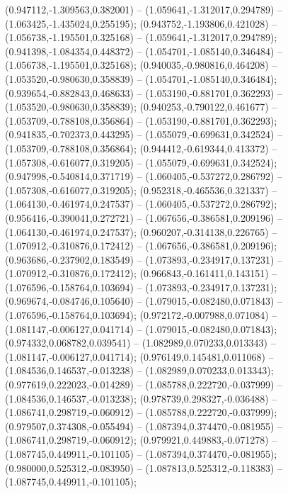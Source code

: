  (0.947112,-1.309563,0.382001) -- (1.059641,-1.312017,0.294789) -- (1.063425,-1.435024,0.255195);
 (0.943752,-1.193806,0.421028) -- (1.056738,-1.195501,0.325168) -- (1.059641,-1.312017,0.294789);
 (0.941398,-1.084354,0.448372) -- (1.054701,-1.085140,0.346484) -- (1.056738,-1.195501,0.325168);
 (0.940035,-0.980816,0.464208) -- (1.053520,-0.980630,0.358839) -- (1.054701,-1.085140,0.346484);
 (0.939654,-0.882843,0.468633) -- (1.053190,-0.881701,0.362293) -- (1.053520,-0.980630,0.358839);
 (0.940253,-0.790122,0.461677) -- (1.053709,-0.788108,0.356864) -- (1.053190,-0.881701,0.362293);
 (0.941835,-0.702373,0.443295) -- (1.055079,-0.699631,0.342524) -- (1.053709,-0.788108,0.356864);
 (0.944412,-0.619344,0.413372) -- (1.057308,-0.616077,0.319205) -- (1.055079,-0.699631,0.342524);
 (0.947998,-0.540814,0.371719) -- (1.060405,-0.537272,0.286792) -- (1.057308,-0.616077,0.319205);
 (0.952318,-0.465536,0.321337) -- (1.064130,-0.461974,0.247537) -- (1.060405,-0.537272,0.286792);
 (0.956416,-0.390041,0.272721) -- (1.067656,-0.386581,0.209196) -- (1.064130,-0.461974,0.247537);
 (0.960207,-0.314138,0.226765) -- (1.070912,-0.310876,0.172412) -- (1.067656,-0.386581,0.209196);
 (0.963686,-0.237902,0.183549) -- (1.073893,-0.234917,0.137231) -- (1.070912,-0.310876,0.172412);
 (0.966843,-0.161411,0.143151) -- (1.076596,-0.158764,0.103694) -- (1.073893,-0.234917,0.137231);
 (0.969674,-0.084746,0.105640) -- (1.079015,-0.082480,0.071843) -- (1.076596,-0.158764,0.103694);
 (0.972172,-0.007988,0.071084) -- (1.081147,-0.006127,0.041714) -- (1.079015,-0.082480,0.071843);
 (0.974332,0.068782,0.039541) -- (1.082989,0.070233,0.013343) -- (1.081147,-0.006127,0.041714);
 (0.976149,0.145481,0.011068) -- (1.084536,0.146537,-0.013238) -- (1.082989,0.070233,0.013343);
 (0.977619,0.222023,-0.014289) -- (1.085788,0.222720,-0.037999) -- (1.084536,0.146537,-0.013238);
 (0.978739,0.298327,-0.036488) -- (1.086741,0.298719,-0.060912) -- (1.085788,0.222720,-0.037999);
 (0.979507,0.374308,-0.055494) -- (1.087394,0.374470,-0.081955) -- (1.086741,0.298719,-0.060912);
 (0.979921,0.449883,-0.071278) -- (1.087745,0.449911,-0.101105) -- (1.087394,0.374470,-0.081955);
 (0.980000,0.525312,-0.083950) -- (1.087813,0.525312,-0.118383) -- (1.087745,0.449911,-0.101105);
